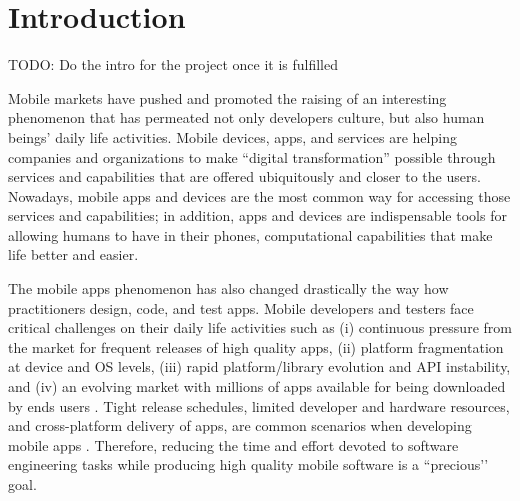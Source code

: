 
\chapter{Introduction} %

\label{Chapter1} %

TODO: Do the intro for the project once it is fulfilled

Mobile markets have pushed and promoted the raising of an interesting phenomenon that has permeated not only developers culture, but also human beings’ daily life activities. Mobile devices, apps, and services are helping companies and organizations to make “digital transformation” possible through services and capabilities that are offered ubiquitously and closer to the users. Nowadays, mobile apps and devices are the most common way for accessing those services and capabilities; in addition, apps and devices are indispensable tools for allowing humans to have in their phones, computational capabilities that make life better and easier.

The mobile apps phenomenon has also changed drastically the way how practitioners design, code, and test apps.  Mobile developers and testers face critical challenges on their daily life activities such as (i) continuous pressure from the market for frequent releases of high quality apps, (ii) platform fragmentation at device and OS levels, (iii) rapid platform/library evolution and API instability, and (iv) an evolving market with millions of apps available for being downloaded by ends users \cite{joorabchi2013real,palomba2018crowdsourcing}. Tight release schedules, limited developer and hardware resources, and cross-platform delivery of apps, are common scenarios when developing mobile apps \cite{joorabchi2013real}. Therefore, reducing the time and effort devoted to software engineering tasks while producing high quality mobile software is a ``precious’’ goal.

